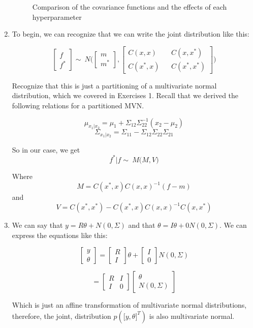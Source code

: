 \documentclass[10pt]{article}
\begin{document}
\begin{enumerate}[label=(\Alph*)]
\begin{figure}[!b]
\begin{center}
    \end{center}
    \caption{Comparison of the covariance functions and the effects of each hyperparameter}
    \label{fig:hyperparams}
    \end{figure}
    \clearpage

    
        \item
        To begin, we can recognize that we can write the joint distribution like this:
        
        $$\begin{bmatrix}f \\ f^* \end{bmatrix} \sim\ N\bigg(\begin{bmatrix} m \\ m^* \end{bmatrix}, 
        \begin{bmatrix} C(x,x) && C(x,x^*) \\ C(x^*, x) && C(x^*, x^*)    \end{bmatrix}\bigg)$$
        
        Recognize that this is just a partitioning of a multivariate normal distribution, which we covered in Exercises 1. Recall that we derived the following relations for a partitioned MVN. 
        
        $$\mu_{x_1|x_2} = \mu_1 + \Sigma_{12}\Sigma_{22}^{-1}(x_2-\mu_2)$$
        $$\Sigma_{x_1|x_2} = \Sigma_{11} - \Sigma_{12}\Sigma_{22}\Sigma_{21}$$
        
        So in our case, we get 
        $$f^*|f \sim\ M\bigg(M, V\bigg)$$
        
        Where 
        $$M = C(x^*, x)C(x,x)^{-1}(f-m)$$
        and 
        $$V = C(x^*,x^*) -  C(x^*,x)C(x,x)^{-1}C(x,x^*)$$
        
        
        \item
        We can say that $y = R\theta + N(0,\Sigma)$ and that $\theta = I\theta + 0 N(0,\Sigma)$. We can express the equations like this:


        $$\begin{bmatrix}y \\ \theta \end{bmatrix}
        = \begin{bmatrix} R \\ I \end{bmatrix} \theta
        +\begin{bmatrix} I \\ 0 \end{bmatrix} N(0,\Sigma)$$

        $$=\begin{bmatrix} R & I \\ I & 0 \end{bmatrix}
        \begin{bmatrix} \theta \\ N(0,\Sigma) \end{bmatrix}$$

        Which is just an affine transformation of multivariate normal distributions, therefore, the joint, distribution $p(\big[y,\theta\big]^T)$ is also multivariate normal. 
        \end{enumerate}
\end{document}
